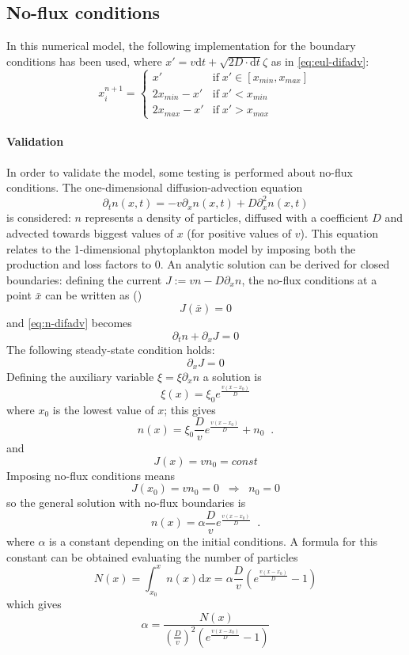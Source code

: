 \subsection{No-flux conditions} \label{sec:no-flux-test}

In this numerical model, the following implementation for the boundary conditions has been used, where \(x' = v \mathrm{d}t + \sqrt{2D\cdot \mathrm{d}t}\zeta\) as in \autoref{eq:eul-difadv}:
\begin{equation}
x_i^{n+1} = \begin{cases}
    x' &\mathrm{if}\; x' \in [x_{min},x_{max}] \\
    2x_{min} - x' &\mathrm{if}\; x' < x_{min} \\
    2x_{max} - x' &\mathrm{if}\; x' > x_{max} 
\end{cases}
\end{equation}

\paragraph{Validation}
In order to validate the model, some testing is performed about no-flux conditions.
The one-dimensional diffusion-advection equation
\begin{equation} \label{eq:n-difadv}
  \partial_t n(x,t) = -v\partial_x n(x,t) +D\partial^2_x n(x,t) 
\end{equation}
is considered: $n$ represents a density of particles, diffused with a coefficient $D$ and advected towards biggest values of $x$ (for positive values of $v$). This equation relates to the 1-dimensional phytoplankton model by imposing both the production and loss factors to 0. An analytic solution can be derived for closed boundaries: defining the current \( J := vn - D\partial_x n \), 
the no-flux conditions at a point $\bar{x}$ can be written as (\autocite{Huisman2002HowPersist})
\begin{equation} \label{eq:noflux}
J(\bar{x}) = 0
\end{equation}
and \autoref{eq:n-difadv} becomes
\[ \partial_t n + \partial_x J = 0 \]
The following steady-state condition holds:
\[ \partial_x J = 0 \]
Defining the auxiliary variable \( \xi=\xi\partial_xn \) a solution is 
\[ \xi(x) = \xi_0 e^{\frac{v(x-x_0)}{D}} \]
where $x_0$ is the lowest value of $x$; this gives
\[ n(x) = \xi_0 \frac{D}{v} e^{\frac{v(x-x_0)}{D}} + n_0 \;\;. \]
and 
\[ J(x) = v n_0 = const \]
Imposing no-flux conditions means 
\[ J(x_0) = vn_0 = 0 \;\; \Rightarrow \;\; n_0 = 0\]
so the general solution with no-flux boundaries is
\begin{equation} \label{eq:rho-noflux-da}
  n(x) = \alpha \frac{D}{v} e^{\frac{v(x-x_0)}{D}} \;\;.
\end{equation}
where $\alpha$ is a constant depending on the initial conditions.
A formula for this constant can be obtained evaluating the number of particles
\[ N(x) = \int_{x_0}^{x} n(x) \mathrm{d}x = \alpha \frac{D}{v} \left( e^{\frac{v(x-x_0)}{D}} - 1 \right) \]
which gives
\begin{equation} \label{eq:rho-noflux-const}
  \alpha =\frac{N(x)}{\left(\frac{D}{v}\right)^2\left( e^{\frac{v(x-x_0)}{D}} - 1 \right)}
\end{equation}

